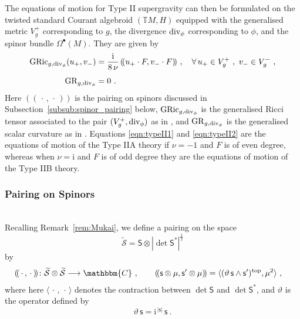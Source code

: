 \documentclass[a4paper, reqno, 11pt]{amsart}
\numberwithin{equation}{section}
\theoremstyle{definition}
\newcommand{\ip}[1]{\langle #1 \rangle}
\newcommand{\ii}{\mathrm{i}}
\newcommand{\IC}{\mathbbm{C}}
\newcommand{\IT}{\mathbb{T}}
\newcommand{\gric}{\mathrm{GRic}}
\newcommand{\cS}{{\mathcal S}}
\newcommand{\sfS}{{\mathsf{S}}}
\newcommand{\sfs}{{\mathsf{s}}}
\newcommand{\sfOmega}{{\mathsf{\Omega}}}
\renewcommand{\div}{{\rm div}}
\theoremstyle{remark}
\begin{document}
The equations of motion for Type II supergravity can then be formulated on the twisted standard Courant algebroid $(\IT M, H)$ equipped with the generalised metric $V_g^+$ corresponding to $g$, the divergence $\div_\phi$ corresponding to $\phi$, and the spinor bundle $\sfOmega^\bullet(M)$. They are given by
\begin{align}
    \gric_{g,\div_\phi}(u_+, v_-) &= \frac{\ii}{8\, \nu}\, (\!( u_+ \cdot F, v_- \cdot F)\!) \ , \quad \forall\, u_+ \in V_g^+ \ , \ v_-\in V_g^- \ , \label{eqn:typeII1}\\[4pt]
    \mathrm{GR}_{g,\div_\phi}&=0\ . \label{eqn:typeII2}
\end{align}
Here $(\!(\, \cdot \, , \, \cdot \,)\!)$ is the pairing on spinors discussed in Subsection~\ref{subsub:spinor_pairing} below, $\gric_{g,\div_\phi}$ is the generalised Ricci tensor associated to the pair $(V^+_g, \div_\phi)$ as in \cite[Definition 3.1]{Severa:2018pag}, and $\mathrm{GR}_{g,\div_\phi}$ is the generalised scalar curvature as in \cite[Definition 4.9]{Streets:2024rfo}.
Equations \eqref{eqn:typeII1} and \eqref{eqn:typeII2} are the equations of motion of the Type IIA theory if $\nu=-1$ and $F$ is of even degree, whereas when $\nu = \ii$ and $F$ is of odd degree they are the equations of motion of the Type IIB theory.

\medskip

\subsubsection{Pairing on Spinors}~\\[5pt]
\label{subsub:spinor_pairing}
Recalling Remark~\ref{rem:Mukai}, we define a pairing on the space $$\widetilde\cS= \sfS \otimes |\det \sfS^*|^{\frac12}$$ by
\begin{equation}
\begin{aligned}
    (\!(\,\cdot \, , \, \cdot \,)\!) &\colon \widetilde \cS \otimes \widetilde \cS \longrightarrow \IC\ , \qquad (\!(\sfs \otimes \mu , \sfs' \otimes \mu)\!) = \ip{(\vartheta\, \sfs \wedge \sfs')^{\rm top}, \mu^2} \ ,
\end{aligned}
\end{equation}
where here $\ip{\,\cdot\, , \,\cdot\,}$ denotes the contraction between $\det \sfS$ and $\det \sfS^*$, and $\vartheta$ is the operator defined by $$\vartheta\, \sfs = \ii^{\,|\sfs|}\,\sfs \ . $$
\end{document}
